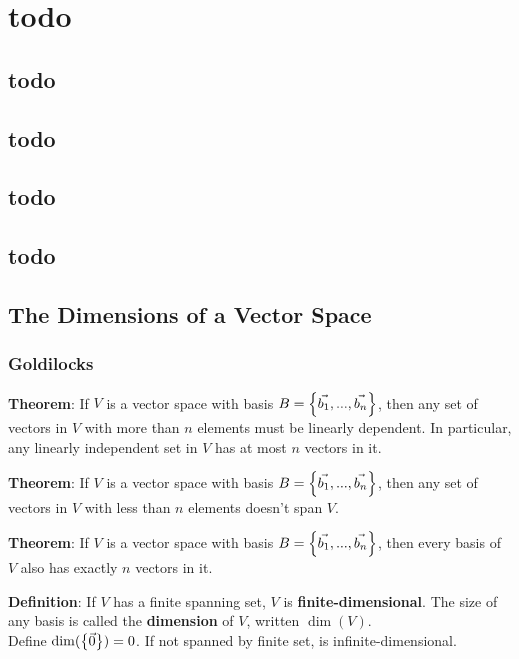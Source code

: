 \section{todo}

\subsection{todo}

\subsection{todo}

\subsection{todo}

\subsection{todo}

\subsection{The Dimensions of a Vector Space}

\subsubsection*{Goldilocks}

\textbf{Theorem}: If $V$ is a vector space with basis $B = \left\{\vec{b_1}, ..., \vec{b_n}\right\}$, then any set of vectors in $V$ with more than $n$ elements must be linearly dependent. In particular, any linearly independent set in $V$ has at most $n$ vectors in it.

\textbf{Theorem}: If $V$ is a vector space with basis $B = \left\{\vec{b_1}, ..., \vec{b_n}\right\}$, then any set of vectors in $V$ with less than $n$ elements doesn't span $V$.

\textbf{Theorem}: If $V$ is a vector space with basis $B = \left\{\vec{b_1}, ..., \vec{b_n}\right\}$, then every basis of $V$ also has exactly $n$ vectors in it.

\textbf{Definition}: If $V$ has a finite spanning set, $V$ is \textbf{finite-dimensional}. The size of any basis is called the \textbf{dimension} of $V$, written $\dim(V)$.\\
Define $\dim(\left\{\vec{0}\right\}) = 0$. If not spanned by finite set, is infinite-dimensional.

